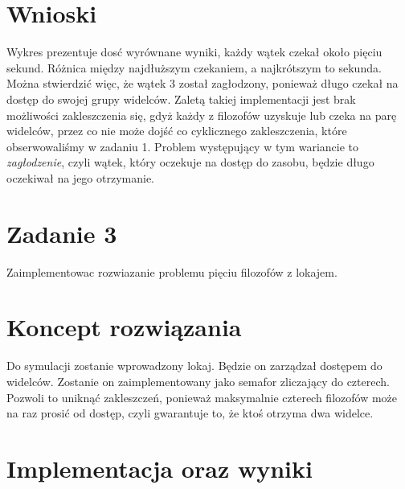 \documentclass[12pt]{article}
\begin{document}
\newpage
\section{Wnioski}
Wykres prezentuje dosć wyrównane wyniki, każdy wątek czekał około pięciu sekund. Różnica między najdłuższym czekaniem, a najkrótszym to sekunda. Można stwierdzić więc, że wątek 3 został zagłodzony, ponieważ długo czekał na dostęp do swojej grupy widelców. Zaletą takiej implementacji jest brak możliwości zakleszczenia się, gdyż każdy z filozofów uzyskuje lub czeka na parę widelców, przez co nie może dojść co cyklicznego zakleszczenia, które obserwowaliśmy w zadaniu 1.
Problem występujący w tym wariancie to \emph{zagłodzenie}, czyli wątek, który oczekuje na dostęp do zasobu, będzie długo oczekiwał na jego otrzymanie. 


\section{Zadanie 3}
Zaimplementowac rozwiazanie problemu pięciu filozofów z lokajem.

\section{Koncept rozwiązania}
Do symulacji zostanie wprowadzony lokaj. Będzie on zarządzał dostępem do widelców. Zostanie on zaimplementowany jako semafor zliczający do czterech. Pozwoli to uniknąć zakleszczeń, ponieważ maksymalnie czterech filozofów może na raz prosić od dostęp, czyli gwarantuje to, że ktoś otrzyma dwa widelce.

\section{Implementacja oraz wyniki}
\end{document}
